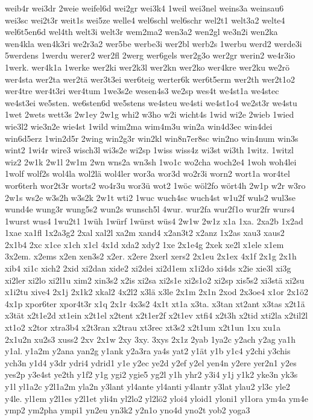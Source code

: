 {weib4r
wei3dr
2weie
weifel6d
wei2gr
wei3k4
1weil
wei3nel
weins3a
weinsau6
wei3sc
wei2t3r
weit1s
wei5ze
welle4
wel6schl
wel6schr
wel2t1
welt3a2
welte4
wel6t5en6d
wel4th
welt3i
welt3r
wem2ma2
wen3a2
wen2gl
we3n2i
wen2ka
wen4kla
wen4k3ri
we2r3a2
wer5be
werbe3i
wer2bl
werb2s
1werbu
werd2
werde3i
5werdens
1werdu
werer2
wer2fl
2werg
wer6gels
wer2g3o
wer2gr
werin2
we4r3io
1werk.
wer4k1a
1werke
wer2ki
wer2k3l
wer2kn
wer2ko
wer4kre
wer2ku
we2rö
wer4sta
wer2ta
wer2tä
wer3t3ei
wer6teig
werter6k
wer6t5erm
wer2th
wer2t1o2
wer4tre
wer4t3ri
wer4tum
1we3s2e
wesen4s3
we2sp
wes4t
we4st1a
we4stec
we4st3ei
we5sten.
we6sten6d
we5stens
we4steu
we4sti
we4st1o4
we2st3r
we4stu
1wet
2wets
wett3s
2w1ey
2w1g
whi2
w3ho
w2i
wicht4s
1wid
wi2e
2wieb
1wied
wie3l2
wie3n2e
wie4st
1wild
wim2ma
wim4m3u
win2a
win4d3ec
win4dei
win6d5erz
1win2d5r
2wing
win2g3r
win2kl
win8n7er8sc
win2no
win4num
win3s
wint2
1wi4r
wire3
wisch3l
wi3s2e
wi2sp
1wiss
wiss4z
wi3st
wi3th
1witz.
1witzl
wiz2
2w1k
2w1l
2w1m
2wn
wns2a
wn3sh
1wo1c
wo2cha
woch2e4
1woh
woh4lei
1wolf
wolf2s
wol4la
wol2lä
wol4ler
wor3a
wor3d
wo2r3i
worn2
wort1a
wor4tel
wor6terh
wor2t3r
worts2
wo4r3u
wor3ü
wot2
1wöc
wöl2fo
wört4h
2w1p
w2r
w3ro
2w1s
ws2e
w3s2h
w3s2k
2w1t
wti2
1wuc
wuch4sc
wuch4st
w1u2f
wuls2
wul3se
wund4e
wung3r
wung5s2
wun2s
wunsch5l
4wur.
wur2fa
wur2f1o
wur2fr
wurs4
1wurst
wus4
1wu2t1
1wüh
1würf
1würst
wüs4
2w1w
2w1z
x1a
1xa.
2xa2b
1x2ad
1xae
xa1fl
1x2a3g2
2xal
xal2l
xa2m
xand4
x2an3t2
x2anz
1x2as
xau3
xaus2
2x1b4
2xc
x1ce
x1ch
x1cl
4x1d
xda2
xdy2
1xe
2x1e4g
2xek
xe2l
x1ele
x1em
3x2em.
x2ems
x2en
xen3s2
x2er.
x2ere
2xerl
xers2
2x1eu
2x1ex
4x1f
2x1g
2x1h
xib4
xi1c
xich2
2xid
xi2dan
xide2
xi2dei
xi2d1em
x1i2do
xi4ds
x2ie
xie3l
xi3g
xi2ler
xi2lo
xi2l1u
xim2
xin3s2
x2is
xi2sa
xi2s1e
xi2s1o2
xi2sp
xis5s2
xi3stä
xi2su
x1i2tu
xive4
2x1j
2x1k2
xkal2
4x2l2
x3lä
x3le
2x1m
2x1n
2xod
2x3oe4
x1or
2x1ö2
4x1p
xpor6ter
xpor4t3r
x1q
2x1r
4x3s2
4x1t
xt1a
x3ta.
x3tan
xt2ant
x3tas
x2t1ä
x3tät
x2t1e2d
xt1ein
x2t1el
x2tent
x2t1er2f
x2t1ev
xtfi4
x2t3h
x2tid
xti2la
x2til2l
xt1o2
x2tor
xtra3b4
x2t3ran
x2trau
xt3rec
xt3s2
x2t1um
x2t1un
1xu
xu1a
2x1u2n
xu2s3
xuss2
2xv
2x1w
2xy
3xy.
3xys
2x1z
2yab
1ya2c
y2ach
y2ag
ya1h
y1al.
y1a2m
y2ana
yan2g
y1ank
y2a3ra
ya4s
yat2
y1ät
y1b
y1c4
y2chi
y3chis
ych3n
y1d4
y3dr
ydri4
ydrid1
y1e
y2ec
ye2d
y2ef
y2el
yen4n
y2ere
yer2n1
y2es
yes2p
y3e4st
ye2th
y1f2
y1g
ygi2
ygie5
yg2l
y1h
yhr2
y3i4
y1j
y1k2
yke3n
yk3s
y1l
yl1a2c
y2l1a2m
yla2n
y3lant
yl4ante
yl4anti
y4lantr
y3lat
ylau2
yl3c
yle2
y4le.
yl1em
y2l1es
y2l1et
yli4n
yl2lo2
yl2lö2
yloi4
yloid1
yloni1
yl1ora
ym4a
ym4e
ymp2
ym2pha
ympi1
yn2eu
yn3k2
y2n1o
yno4d
yno2t
yob2
yoga3
}

